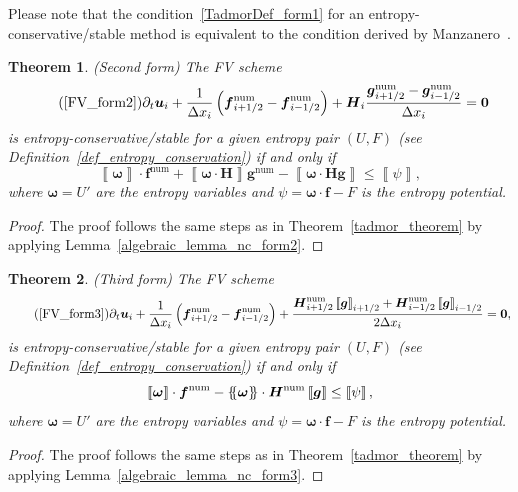 \documentclass[]{scrartcl}
\newcommand*{\ldblbrace}{\{\mskip-5mu \left \{}
\newcommand*{\rdblbrace}{ \}\mskip-5mu \right \}}
\newcommand{\mean}[1]{\left\ldblbrace #1 \right\rdblbrace}
\renewcommand{\vec}[1]{\boldsymbol{#1}}
\newcommand{\jump}[1]{\left\llbracket #1  \right\rrbracket}
\newtheorem{theorem}{Theorem}[section]
\theoremstyle{definition}
\begin{document}
Please note that the condition~\eqref{TadmorDef_form1} for an entropy-conservative/stable method is equivalent to the condition derived by Manzanero~\cite[Eq.~(3.106)]{Manzanero2020AHD}.

\begin{theorem}{(Second form)}
The FV scheme
\begin{equation}
    \tag{\ref{FV_form2}}
\partial_t \vec{u}_i + \frac{1}{\Delta x_i} \left  ( \vec{f}^{\mathrm{num}}_{i+1/2} - \vec{f}^{\mathrm{num}}_{i-1/2}\right ) + \vec{H}_i \frac{ \vec{g}^{\mathrm{num}}_{i+1/2}- \vec{g}^{\mathrm{num}}_{i-1/2}}{\Delta x_i}  = \vec{0}
\end{equation}
is entropy-conservative/stable for a given entropy pair $(U, F)$ (see Definition~\ref{def_entropy_conservation}) if and only if
\begin{equation}
\label{TadmorDef_form2}
	\jump{\vec{\omega}} \cdot \vec{f}^\mathrm{num} +\jump{\vec{\omega} \cdot \vec{H}}\vec{g}^{\mathrm{num}} - \jump{\vec{\omega} \cdot \vec{H} \vec{g}} \leq \jump{\psi},
\end{equation}
where $\vec{\omega} = U'$ are the entropy variables and $\psi = \vec{\omega} \cdot \vec{f} - F$ is the entropy potential.
\end{theorem}
\begin{proof}
The proof follows the same steps as in Theorem~\ref{tadmor_theorem} by applying Lemma~\ref{algebraic_lemma_nc_form2}.
\end{proof}

\begin{theorem}{(Third form)}
    The FV scheme
    \begin{equation}
    \tag{\ref{FV_form3}}
\partial_t \vec{u}_i + \frac{1}{\Delta x_i} \left  ( \vec{f}^{\mathrm{num}}_{i+1/2} - \vec{f}^{\mathrm{num}}_{i-1/2}\right ) + \frac{\vec{H}^{\mathrm{num}}_{i+1/2} \jump{\vec{g}}_{i+1/2} + \vec{H}^{\mathrm{num}}_{i-1/2}  \jump{\vec{g}}_{i-1/2}}{2 \Delta x_i}  = \vec{0},
\end{equation}
is entropy-conservative/stable for a given entropy pair $(U, F)$ (see Definition~\ref{def_entropy_conservation}) if and only if
\begin{equation}
\label{TadmorDef_form3}
	\jump{\vec{\omega}} \cdot \vec{f}^\mathrm{num} -\mean{\vec{\omega}} \cdot \vec{H}^{\mathrm{num}}\jump{\vec{g}} \leq \jump{\psi},
\end{equation}
where $\vec{\omega} = U'$ are the entropy variables and $\psi = \vec{\omega} \cdot \vec{f} - F$ is the entropy potential.
\end{theorem}
\begin{proof}
The proof follows the same steps as in Theorem~\ref{tadmor_theorem} by applying Lemma~\ref{algebraic_lemma_nc_form3}.
\end{proof}
\end{document}
